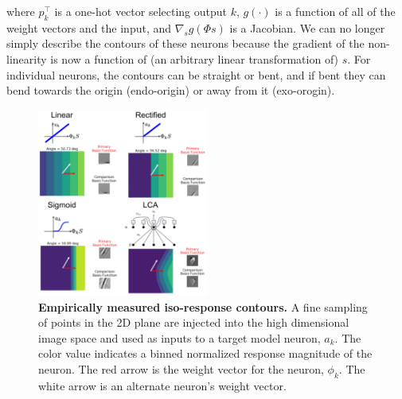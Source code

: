where $p_{k}^\top$ is a one-hot vector selecting output $k$, $g(\cdot)$ is a function of all of the weight vectors and the input, and $\nabla_{s}g(\Phi s)$ is a Jacobian. We can no longer simply describe the contours of these neurons because the gradient of the non-linearity is now a function of (an arbitrary linear transformation of) $s$. For individual neurons, the contours can be straight or bent, and if bent they can bend towards the origin (endo-origin) or away from it (exo-orogin).

\begin{figure}\label{fig:ch4_iso_contours}
\begin{center}
\centerline{\includegraphics[width=0.5\textwidth]{figures/iso_contour_comparison.png}}
\end{center}
\caption{\textbf{Empirically measured iso-response contours.} A fine sampling of points in the 2D plane are injected into the high dimensional image space and used as inputs to a target model neuron, $a_{k}$. The color value indicates a binned normalized response magnitude of the neuron. The red arrow is the weight vector for the neuron, $\phi_{k}$. The white arrow is an alternate neuron's weight vector.}
\end{figure}

